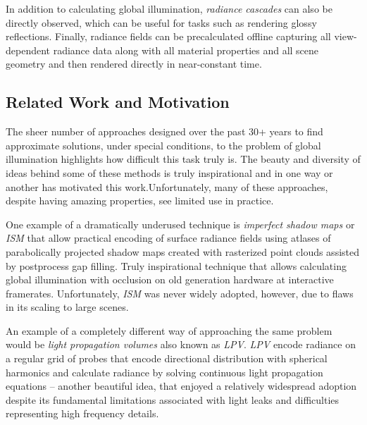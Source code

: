 \documentclass{jcgt}
\begin{document}
In addition to calculating global illumination, \emph{radiance cascades} can also be directly observed, which can be useful for tasks such as rendering glossy reflections. Finally, radiance fields can be precalculated offline
capturing all view-dependent radiance data along with all material properties and all scene geometry and then rendered directly in near-constant time.


\subsection{Related Work and Motivation}
\label{sec:relatedwork}

The sheer number of approaches designed over the past 30+ years to find approximate solutions, under special conditions, to the problem of global illumination highlights how difficult this task truly is. The beauty and diversity of ideas behind some of these methods is truly inspirational and in one way or another has motivated this work.Unfortunately, many of these approaches, despite having amazing properties, see limited use in practice.

One example of a dramatically underused technique is \emph{imperfect shadow maps} or \emph{ISM} that allow practical encoding of surface radiance fields using atlases of
parabolically projected shadow maps created with rasterized point clouds assisted by postprocess gap filling. Truly inspirational technique that allows calculating global illumination with occlusion on old generation hardware at interactive framerates. Unfortunately, \emph{ISM} was never widely adopted, however, due to flaws in its scaling to large scenes.

An example of a completely different way of approaching the same problem would be \emph{light propagation volumes} also known as \emph{LPV}. \emph{LPV} encode radiance on a regular grid of probes that encode directional distribution with spherical harmonics and calculate radiance by solving continuous light propagation equations -- another beautiful idea, that enjoyed a relatively widespread adoption despite its fundamental limitations associated with light leaks and difficulties representing high frequency details.
\end{document}
